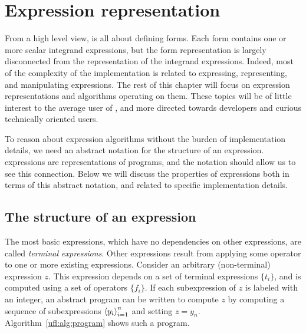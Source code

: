 \section{Expression representation} \label{ufl:sec:representation}

From a high level view, \ufl{} is all about defining forms.  Each form
contains one or more scalar integrand expressions, but the form
representation is largely disconnected from the representation of the
integrand expressions.  Indeed, most of the complexity of the \ufl{}
implementation is related to expressing, representing, and
manipulating expressions.  The rest of this chapter will focus on
expression representations and algorithms operating on them.  These
topics will be of little interest to the average user of \ufl{}, and
more directed towards developers and curious technically oriented
users.

To reason about expression algorithms without the burden of
implementation details, we need an abstract notation for the structure
of an expression.  \ufl{} expressions are representations of programs,
and the notation should allow us to see this connection. Below we will
discuss the properties of expressions both in terms of this abstract
notation, and related to specific implementation details.


\subsection{The structure of an expression} \label{ufl:sec:expressions}
The most basic expressions, which have no dependencies on other
expressions, are called \emph{terminal expressions}.  Other
expressions result from applying some operator to one or more existing
expressions.  Consider an arbitrary (non-terminal) expression $z$.
This expression depends on a set of terminal expressions $\{ t_i \}$,
and is computed using a set of operators $\{ f_i \}$.  If each
subexpression of $z$ is labeled with an integer, an abstract program
can be written to compute $z$ by computing a sequence of
subexpressions $\left\langle{y_i}\right\rangle_{i=1}^n$ and setting $z = y_n$.
Algorithm~\ref{ufl:alg:program} shows such a program.

